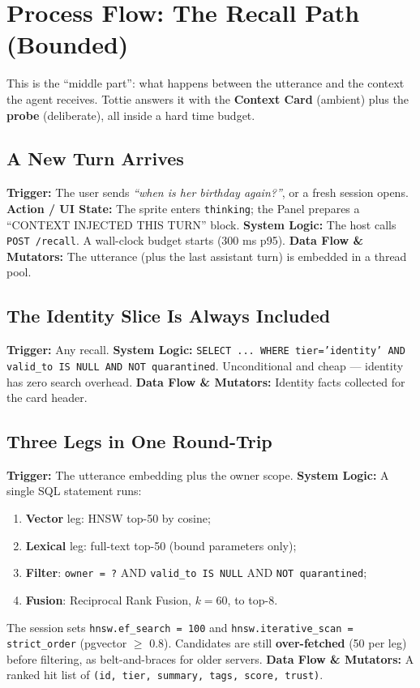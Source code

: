 \chapter{Process Flow: The Recall Path (Bounded)}
This is the ``middle part'': what happens between the utterance and the context the agent receives.
Tottie answers it with the \textbf{Context Card} (ambient) plus the \textbf{probe} (deliberate), all
inside a hard time budget.

\section{A New Turn Arrives}
\textbf{Trigger:} The user sends \emph{``when is her birthday again?''}, or a fresh session opens.
\textbf{Action / UI State:} The sprite enters \texttt{thinking}; the Panel prepares a ``CONTEXT
INJECTED THIS TURN'' block.
\textbf{System Logic:} The host calls \texttt{POST /recall}. A wall-clock budget starts (300 ms p95).
\textbf{Data Flow \& Mutators:} The utterance (plus the last assistant turn) is embedded in a thread
pool.

\section{The Identity Slice Is Always Included}
\textbf{Trigger:} Any recall.
\textbf{System Logic:} \texttt{SELECT ... WHERE tier='identity' AND valid\_to IS NULL AND NOT
quarantined}. Unconditional and cheap --- identity has zero search overhead.
\textbf{Data Flow \& Mutators:} Identity facts collected for the card header.

\section{Three Legs in One Round-Trip}
\textbf{Trigger:} The utterance embedding plus the owner scope.
\textbf{System Logic:} A single SQL statement runs:
\begin{enumerate}
  \item \textbf{Vector} leg: HNSW top-50 by cosine;
  \item \textbf{Lexical} leg: full-text top-50 (bound parameters only);
  \item \textbf{Filter}: \texttt{owner = ?} AND \texttt{valid\_to IS NULL} AND \texttt{NOT quarantined};
  \item \textbf{Fusion}: Reciprocal Rank Fusion, $k=60$, to top-8.
\end{enumerate}
The session sets \texttt{hnsw.ef\_search = 100} and \texttt{hnsw.iterative\_scan = strict\_order}
(pgvector $\geq$ 0.8). Candidates are still \textbf{over-fetched} (50 per leg) before filtering,
as belt-and-braces for older servers.
\textbf{Data Flow \& Mutators:} A ranked hit list of \texttt{(id, tier, summary, tags, score, trust)}.

